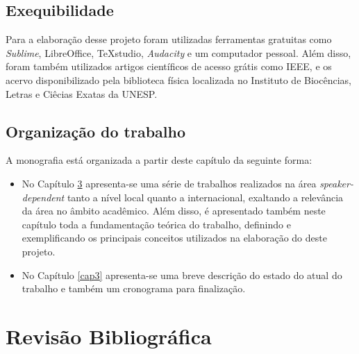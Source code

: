 \documentclass[a4paper,12pt,twoside,openright]{report}
\begin{document}
\section{Exequibilidade}
\par Para a elabora{\c c}\~{a}o desse projeto foram utilizadas ferramentas gratuitas como \textit{Sublime}, LibreOffice, TeXstudio, \textit{Audacity} e um computador pessoal. Al\'{e}m disso, foram tamb\'{e}m utilizados artigos cient\'{i}ficos de acesso gr\'{a}tis como IEEE, e os acervo disponibilizado pela biblioteca f\'{i}sica localizada no Instituto de Bioc\^{e}ncias, Letras e Ci\^{e}cias Exatas da UNESP.
\section{Organiza\c{c}\~{a}o do trabalho}
\par A monografia est\'{a} organizada a partir deste cap\'{i}tulo da seguinte forma:

\begin{itemize}
\item{}No Cap\'{i}tulo \ref{cap2} apresenta-se uma s\'{e}rie de trabalhos realizados na \'{a}rea \textit{speaker-dependent} tanto a n\'{i}vel local quanto a internacional, exaltando a relev\^{a}ncia da \'{a}rea no \^{a}mbito acad\^{e}mico. Al\'{e}m disso, \'{e} apresentado tamb\'{e}m neste cap\'{i}tulo toda a fundamenta{\c c}\~{a}o te\'{o}rica do trabalho, definindo e exemplificando os principais conceitos utilizados na elabora{\c c}\~{a}o do deste projeto.
\end{itemize}

\begin{itemize}
	\item{}No Cap\'{i}tulo \ref{cap3} apresenta-se uma breve descri{\c c}\~{a}o do estado do atual do trabalho e tamb\'{e}m um cronograma para finaliza{\c c}\~{a}o.
\end{itemize}
\chapter{Revis\~{a}o Bibliogr\'{a}fica}
\label{cap2}
\thispagestyle{myheadings}
\end{document}
